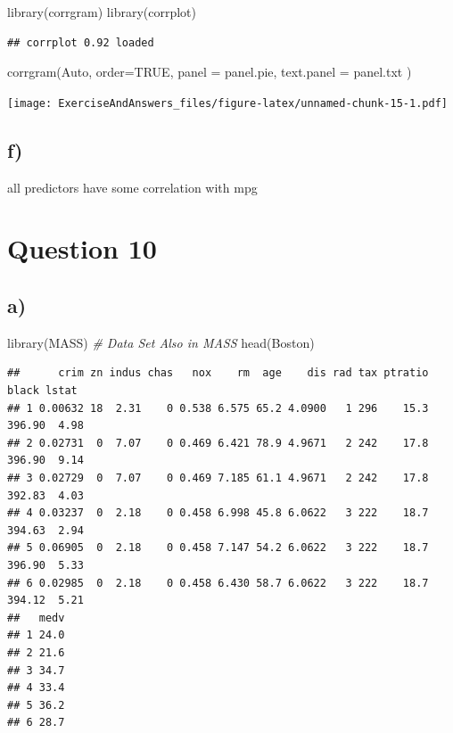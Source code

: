 \documentclass[
]{article}
\newenvironment{Shaded}{\begin{snugshade}}{\end{snugshade}}
\newcommand{\AttributeTok}[1]{\textcolor[rgb]{0.77,0.63,0.00}{#1}}
\newcommand{\CommentTok}[1]{\textcolor[rgb]{0.56,0.35,0.01}{\textit{#1}}}
\newcommand{\ConstantTok}[1]{\textcolor[rgb]{0.00,0.00,0.00}{#1}}
\newcommand{\FunctionTok}[1]{\textcolor[rgb]{0.00,0.00,0.00}{#1}}
\newcommand{\NormalTok}[1]{#1}
\begin{document}
\begin{Shaded}
\begin{Highlighting}[]
\FunctionTok{library}\NormalTok{(corrgram)}
\FunctionTok{library}\NormalTok{(corrplot)}
\end{Highlighting}
\end{Shaded}

\begin{verbatim}
## corrplot 0.92 loaded
\end{verbatim}

\begin{Shaded}
\begin{Highlighting}[]
\FunctionTok{corrgram}\NormalTok{(Auto, }\AttributeTok{order=}\ConstantTok{TRUE}\NormalTok{, }
         \AttributeTok{panel =}\NormalTok{ panel.pie, }
         \AttributeTok{text.panel =}\NormalTok{ panel.txt}
\NormalTok{         )}
\end{Highlighting}
\end{Shaded}

\texttt{[image: ExerciseAndAnswers\_files/figure-latex/unnamed-chunk-15-1.pdf]}

\hypertarget{f}{%
\subsection{f)}\label{f}}

all predictors have some correlation with mpg

\hypertarget{question-10}{%
\section{Question 10}\label{question-10}}

\hypertarget{a-7}{%
\subsection{a)}\label{a-7}}

\begin{Shaded}
\begin{Highlighting}[]
\FunctionTok{library}\NormalTok{(MASS) }\CommentTok{\# Data Set Also in MASS}
\FunctionTok{head}\NormalTok{(Boston) }
\end{Highlighting}
\end{Shaded}

\begin{verbatim}
##      crim zn indus chas   nox    rm  age    dis rad tax ptratio  black lstat
## 1 0.00632 18  2.31    0 0.538 6.575 65.2 4.0900   1 296    15.3 396.90  4.98
## 2 0.02731  0  7.07    0 0.469 6.421 78.9 4.9671   2 242    17.8 396.90  9.14
## 3 0.02729  0  7.07    0 0.469 7.185 61.1 4.9671   2 242    17.8 392.83  4.03
## 4 0.03237  0  2.18    0 0.458 6.998 45.8 6.0622   3 222    18.7 394.63  2.94
## 5 0.06905  0  2.18    0 0.458 7.147 54.2 6.0622   3 222    18.7 396.90  5.33
## 6 0.02985  0  2.18    0 0.458 6.430 58.7 6.0622   3 222    18.7 394.12  5.21
##   medv
## 1 24.0
## 2 21.6
## 3 34.7
## 4 33.4
## 5 36.2
## 6 28.7
\end{verbatim}
\end{document}
